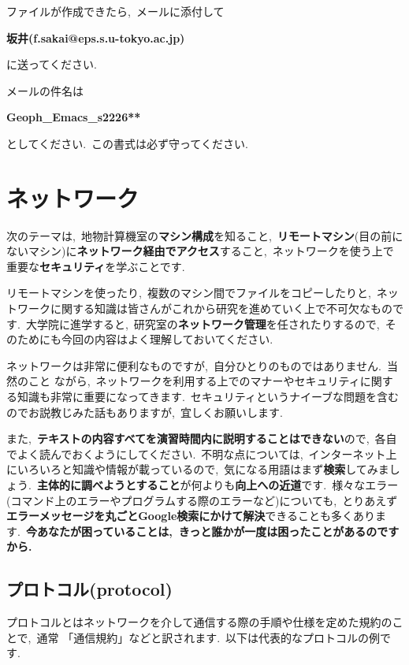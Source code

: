 \documentclass{jarticle}
\begin{document}
ファイルが作成できたら,\ メールに添付して
\begin{center}
{\bf{坂井(f.sakai@eps.s.u-tokyo.ac.jp)}}
\end{center}
に送ってください.\ 

メールの件名は 
\begin{center}
{\bf{Geoph\_Emacs\_s2226**}}\\
\end{center}
としてください.\ この書式は必ず守ってください.\ 

\section{ネットワーク}
次のテーマは,\ 地物計算機室の{\bf マシン構成}を知ること,\ {\bf リモートマシン}(目の前にないマシン)に{\bf ネットワーク経由でアクセス}すること,\ ネットワークを使う上で重要な{\bf セキュリティ}を学ぶことです.\ 

リモートマシンを使ったり,\ 複数のマシン間でファイルをコピーしたりと,\ ネットワークに関する知識は皆さんがこれから研究を進めていく上で不可欠なものです.\ 大学院に進学すると,\ 研究室の{\bf ネットワーク管理}を任されたりするので,\ そのためにも今回の内容はよく理解しておいてください.\ 

\vspace{1em}

ネットワークは非常に便利なものですが,\ 自分ひとりのものではありません.\ 当然のこと
ながら,\ ネットワークを利用する上でのマナーやセキュリティに関する知識も非常に重要になってきます.\ セキュリティというナイーブな問題を含むのでお説教じみた話もありますが,\ 宜しくお願いします.\ 

また,\ {\bf テキストの内容すべてを演習時間内に説明することはできない}ので,\ 各自でよく読んでおくようにしてください.\ 不明な点については,\ インターネット上にいろいろと知識や情報が載っているので,\ 気になる用語はまず{\bf 検索}してみましょう.\ {\bf 主体的に調べようとすること}が何よりも{\bf 向上への近道}です.\ 様々なエラー(コマンド上のエラーやプログラムする際のエラーなど)についても,\ とりあえず{\bf エラーメッセージを丸ごとGoogle検索にかけて解決}できることも多くあります.\ {\bf 今あなたが困っていることは,\ きっと誰かが一度は困ったことがあるのですから.\ }

\subsection{プロトコル(protocol)}
プロトコルとはネットワークを介して通信する際の手順や仕様を定めた規約のことで,\ 通常
「通信規約」などと訳されます.\ 以下は代表的なプロトコルの例です.\ 
\end{document}
